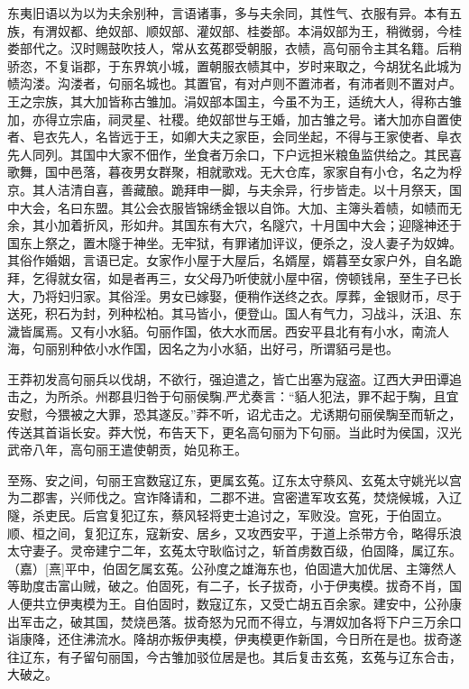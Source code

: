 \documentclass[12pt,UTF8]{ctexbook}
\begin{document}
东夷旧语以为以为夫余别种，言语诸事，多与夫余同，其性气、衣服有异。本有五族，有渭奴都、绝奴部、顺奴部、灌奴部、桂娄部。本涓奴部为王，稍微弱，今桂娄部代之。汉时赐鼓吹技人，常从玄菟郡受朝服，衣帻，高句丽令主其名籍。后稍骄恣，不复诣郡，于东界筑小城，置朝服衣帻其中，岁时来取之，今胡犹名此城为帻沟溇。沟溇者，句丽名城也。其置官，有对卢则不置沛者，有沛者则不置对卢。王之宗族，其大加皆称古雏加。涓奴部本国主，今虽不为王，适统大人，得称古雏加，亦得立宗庙，祠灵星、社稷。绝奴部世与王婚，加古雏之号。诸大加亦自置使者、皂衣先人，名皆远于王，如卿大夫之家臣，会同坐起，不得与王家使者、阜衣先人同列。其国中大家不佃作，坐食者万余口，下户远担米粮鱼监供给之。其民喜歌舞，国中邑落，暮夜男女群聚，相就歌戏。无大仓库，家家自有小仓，名之为桴京。其人洁清自喜，善藏酿。跪拜申一脚，与夫余异，行步皆走。以十月祭天，国中大会，名曰东盟。其公会衣服皆锦绣金银以自饰。大加、主簿头着帻，如帻而无余，其小加着折风，形如弁。其国东有大穴，名隧穴，十月国中大会；迎隧神还于国东上祭之，置木隧于神坐。无牢狱，有罪诸加评议，便杀之，没人妻子为奴婢。其俗作婚姻，言语已定。女家作小屋于大屋后，名婿屋，婿暮至女家户外，自名跪拜，乞得就女宿，如是者再三，女父母乃听使就小屋中宿，傍顿钱帛，至生子已长大，乃将妇归家。其俗淫。男女已嫁娶，便稍作送终之衣。厚葬，金银财币，尽于送死，积石为封，列种松柏。其马皆小，便登山。国人有气力，习战斗，沃沮、东濊皆属焉。又有小水貊。句丽作国，依大水而居。西安平县北有有小水，南流人海，句丽别种依小水作国，因名之为小水貊，出好弓，所谓貊弓是也。

王莽初发高句丽兵以伐胡，不欲行，强迫遣之，皆亡出塞为寇盗。辽西大尹田谭追击之，为所杀。州郡县归咎于句丽侯騊.严尤奏言：“貊人犯法，罪不起于騊，且宜安慰，今猥被之大罪，恐其遂反。”莽不听，诏尤击之。尤诱期句丽侯騊至而斩之，传送其首诣长安。莽大悦，布告天下，更名高句丽为下句丽。当此时为侯国，汉光武帝八年，高句丽王遣使朝贡，始见称王。

至殇、安之间，句丽王宫数寇辽东，更属玄菟。辽东太守蔡风、玄菟太守姚光以宫为二郡害，兴师伐之。宫诈降请和，二郡不进。宫密遣军攻玄菟，焚烧候城，入辽隧，杀吏民。后宫复犯辽东，蔡风轻将吏士追讨之，军败没。宫死，于伯固立。顺、桓之间，复犯辽东，寇新安、居乡，又攻西安平，于道上杀带方令，略得乐浪太守妻子。灵帝建宁二年，玄菟太守耿临讨之，斩首虏数百级，伯固降，属辽东。（嘉）[熹]平中，伯固乞属玄菟。公孙度之雄海东也，伯固遣大加优居、主簿然人等助度击富山贼，破之。伯固死，有二子，长子拔奇，小于伊夷模。拔奇不肖，国人便共立伊夷模为王。自伯固时，数寇辽东，又受亡胡五百余家。建安中，公孙康出军击之，破其国，焚烧邑落。拔奇怒为兄而不得立，与渭奴加各将下户三万余口诣康降，还住沸流水。降胡亦叛伊夷模，伊夷模更作新国，今日所在是也。拔奇遂往辽东，有子留句丽国，今古雏加驳位居是也。其后复击玄菟，玄菟与辽东合击，大破之。
\end{document}
